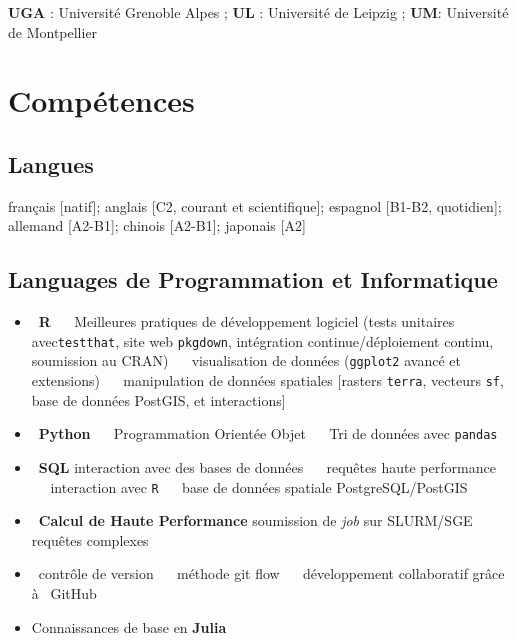 \documentclass[12pt,a4paper,]{article}
\providecommand{\tightlist}{%
  \setlength{\itemsep}{0pt}\setlength{\parskip}{0pt}}
\begin{document}
\textbf{UGA} : Université Grenoble Alpes ; \textbf{UL} : Université de
Leipzig ; \textbf{UM}: Université de Montpellier

\section{Compétences}\label{compuxe9tences}

\subsection{Langues}\label{langues}

français {[}natif{]}; anglais {[}C2, courant et scientifique{]};
espagnol {[}B1-B2, quotidien{]}; allemand {[}A2-B1{]}; chinois
{[}A2-B1{]}; japonais {[}A2{]}

\subsection{Languages de Programmation et
Informatique}\label{languages-de-programmation-et-informatique}

\begin{itemize}
\tightlist
\item
  \faRProject~\textbf{R} ~\textbullet~ Meilleures pratiques de
  développement logiciel (tests unitaires avec\texttt{testthat}, site
  web \texttt{pkgdown}, intégration continue/déploiement continu,
  soumission au CRAN) ~\textbullet~ visualisation de données
  (\texttt{ggplot2} avancé et extensions) ~\textbullet~ manipulation de
  données spatiales {[}rasters \texttt{terra}, vecteurs \texttt{sf},
  base de données PostGIS, et interactions{]}
\item
  \faPython~\textbf{Python} ~\textbullet~ Programmation Orientée Objet
  ~\textbullet~ Tri de données avec \texttt{pandas}
\item
  \faDatabase~\textbf{SQL} interaction avec des bases de données
  ~\textbullet~ requêtes haute performance ~\textbullet~ interaction
  avec \texttt{R} ~\textbullet~ base de données spatiale
  PostgreSQL/PostGIS
\item
  \faServer~\textbf{Calcul de Haute Performance} soumission de
  \emph{job} sur SLURM/SGE ~\textbullet~ requêtes complexes
\item
  \faGit~contrôle de version ~\textbullet~ méthode git flow
  ~\textbullet~ développement collaboratif grâce à \faGithub~GitHub
\item
  Connaissances de base en \textbf{Julia}
\end{itemize}
\end{document}
